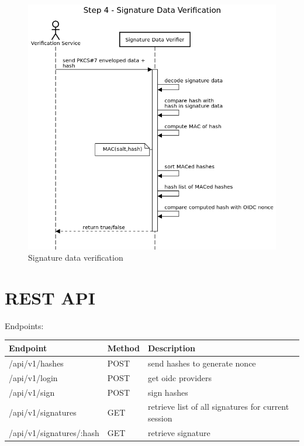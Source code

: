 \begin{figure}
	\begin{center}
		\includegraphics[scale=0.5]{images/protocol_verification_step4_signature_data.png}
		\caption{Signature data verification}
		\label{fig:signaturedataverification}
	\end{center}
\end{figure}

\section{REST API}\label{sec:rest-api}
Endpoints:

\begin{tabular}{|l|l|l|}
	\hline
	Endpoint & Method & Description \\ \hline
	/api/v1/hashes & POST & send hashes to generate nonce \\ \hline
	/api/v1/login & POST & get oidc providers \\ \hline
	/api/v1/sign & POST & sign hashes \\ \hline
	/api/v1/signatures & GET & retrieve list of all signatures for current session \\ \hline
	/api/v1/signatures/:hash & GET & retrieve signature \\ \hline
\end{tabular}

